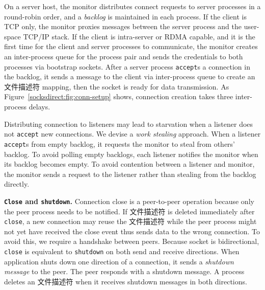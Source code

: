 On a server host, the monitor distributes connect requests to server processes in a round-robin order, and a \textit{backlog} is maintained in each process. If the client is TCP only, the monitor proxies messages between the server process and the user-space TCP/IP stack. If the client is intra-server or RDMA capable, and it is the first time for the client and server processes to communicate, the monitor creates an inter-process queue for the process pair and sends the credentials to both processes via bootstrap sockets. After a server process \texttt{accept}s a connection in the backlog, it sends a message to the client via inter-process queue to create an 文件描述符 mapping, then the socket is ready for data transmission. As Figure~\ref{socksdirect:fig:conn-setup} shows, connection creation takes three inter-process delays.

Distributing connection to listeners may lead to starvation when a listener does not \texttt{accept} new connections. We devise a \textit{work stealing} approach. When a listener \texttt{accept}s from empty backlog, it requests the monitor to steal from others' backlog. To avoid polling empty backlogs, each listener notifies the monitor when its backlog becomes empty. To avoid contention between a listener and monitor, the monitor sends a request to the listener rather than stealing from the backlog directly.


\textbf{\texttt{Close} and \texttt{shutdown}.}
Connection close is a peer-to-peer operation because only the peer process needs to be notified. If 文件描述符 is deleted immediately after \texttt{close}, a new connection may reuse the 文件描述符 while the peer process might not yet have received the close event thus sends data to the wrong connection. To avoid this, we require a handshake between peers.
Because socket is bidirectional, \texttt{close} is equivalent to \texttt{shutdown} on both send and receive directions.
When application shuts down one direction of a connection, it sends a \textit{shutdown message} to the peer. The peer responds with a shutdown message. A process deletes an 文件描述符 when it receives shutdown messages in both directions.


